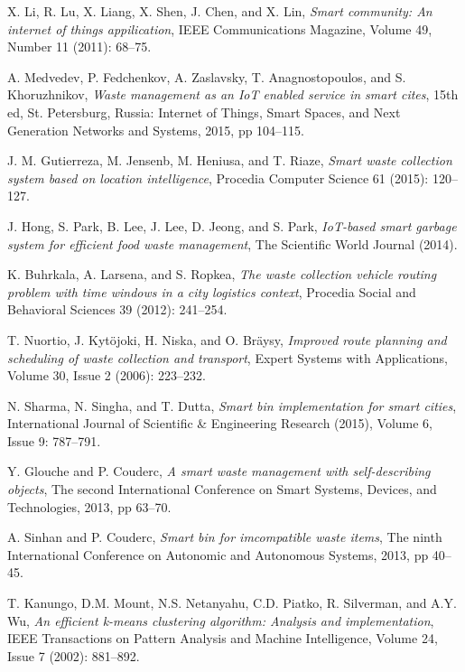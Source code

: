 \documentclass[conference,compsoc]{IEEEtran}
\begin{document}
\begin{thebibliography}{1}
X. Li, R. Lu, X. Liang, X. Shen, J. Chen, and X. Lin, \emph{Smart community: An internet of things appilication}, IEEE Communications Magazine, Volume 49, Number 11 (2011): 68--75.

A. Medvedev, P. Fedchenkov, A. Zaslavsky, T. Anagnostopoulos, and S. Khoruzhnikov, \emph{Waste management as an IoT enabled service in smart cites}, 15th ed, St. Petersburg, Russia: Internet of Things, Smart Spaces, and Next Generation Networks and Systems, 2015, pp 104--115.



J. M. Gutierreza, M. Jensenb, M. Heniusa, and T. Riaze, \emph{Smart waste collection system based on location intelligence}, Procedia Computer Science 61 (2015): 120--127.


J. Hong, S. Park, B. Lee, J. Lee, D. Jeong, and S. Park, \emph{IoT-based smart garbage system for efficient food waste management}, The Scientific World Journal (2014).




K. Buhrkala, A. Larsena, and S. Ropkea, \emph{The waste collection vehicle routing problem with time windows in a city logistics context}, Procedia Social and Behavioral Sciences 39 (2012): 241--254.


T. Nuortio, J. Kyt\"ojoki, H. Niska, and O. Br\"aysy, \emph{Improved route planning and scheduling of waste collection and transport}, Expert Systems with Applications, Volume 30, Issue 2 (2006): 223--232.


N. Sharma, N. Singha, and T. Dutta, \emph{Smart bin implementation for smart cities}, International Journal of Scientific \& Engineering Research (2015), Volume 6, Issue 9: 787--791.


Y. Glouche and P. Couderc, \emph{A smart waste management with self-describing objects}, The second International Conference on Smart Systems, Devices, and Technologies, 2013, pp 63--70.


A. Sinhan and P. Couderc, \emph{Smart bin for imcompatible waste items}, The ninth International Conference on Autonomic and Autonomous Systems, 2013, pp 40--45.


 T. Kanungo, D.M. Mount, N.S. Netanyahu, C.D. Piatko, R. Silverman, and A.Y. Wu, \emph{An efficient k-means clustering algorithm: Analysis and implementation}, IEEE Transactions on Pattern Analysis and Machine Intelligence, Volume 24, Issue 7 (2002): 881--892.



\end{thebibliography}
\end{document}
